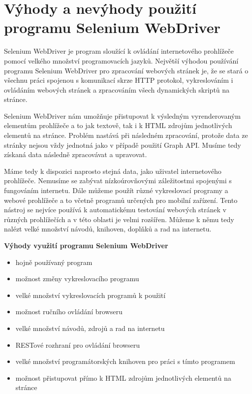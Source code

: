 \documentclass[thesis=M,czech]{FITthesis}[2013/05/10]
\begin{document}
\section{Výhody a nevýhody použití programu Selenium WebDriver}

Selenium WebDriver je program sloužící k ovládání internetového prohlížeče pomocí velkého množství programovacích jazyků. Největší výhodou používání programu Selenium WebDriver pro zpracování webových stránek je, že se stará o všechnu práci spojenou s komunikací skrze HTTP protokol, vykreslováním i ovládáním webových stránek a zpracováním všech dynamických skriptů na stránce. 

Selenium WebDriver nám umožňuje přistupovat k výsledným vyrenderovaným elementům prohlížeče a to jak textově, tak i k HTML zdrojům jednotlivých elementů na stránce. Problém nastává při následném zpracování, protože data ze stránky nejsou vždy jednotná jako v případě použití Graph API. Musíme tedy získaná data následně zpracovávat a upravovat.

Máme tedy k dispozici naprosto stejná data, jako uživatel internetového prohlížeče. Nemusíme se zabývat nízkoúrovňovými záležitostmi spojenými s fungováním internetu. Dále můžeme použít různé vykreslovací programy a webové prohlížeče a to včetně programů určených pro mobilní zařízení. Tento nástroj se nejvíce používá k automatickému testování webových stránek v různých prohlížečích a v této oblasti je velmi rozšířen. Můžeme k němu tedy nalézt velké množství návodů, knihoven, doplňků a rad na internetu. 

\textbf{Výhody využití programu Selenium WebDriver}

\begin{itemize}
  \item hojně používaný program
  \item možnost změny vykreslovacího programu
  \item velké množství vykreslovacích programů k použití
  \item možnost ručního ovládání browseru
  \item velké množství návodů, zdrojů a rad na internetu
  \item RESTové rozhraní pro ovládání browseru
  \item velké množství programátorských knihoven pro práci s tímto programem
  \item možnost přistupovat přímo k HTML zdrojům jednotlivých elementů na stránce
\end{itemize}
\end{document}
